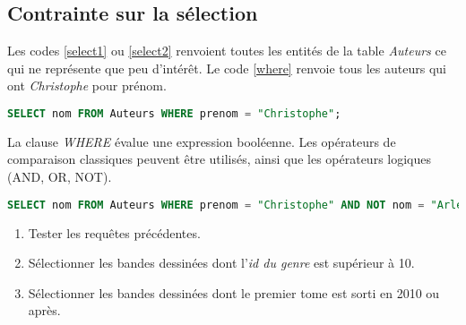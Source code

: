 \documentclass[a4paper,11pt]{article}
\begin{document}
\begin{Form}
\subsection{Contrainte sur la sélection}
Les codes \ref{select1} ou \ref{select2} renvoient toutes les entités de la table \emph{Auteurs} ce qui ne représente que peu d'intérêt. Le code \ref{where} renvoie tous les auteurs qui ont \emph{Christophe} pour prénom.
\begin{center}
\begin{lstlisting}[language=SQL]
SELECT nom FROM Auteurs WHERE prenom = "Christophe";
\end{lstlisting}
\label{where}
\end{center}
La clause \emph{WHERE} évalue une expression booléenne. Les opérateurs de comparaison classiques peuvent être utilisés, ainsi que les opérateurs logiques (AND, OR, NOT).
\begin{center}
\begin{lstlisting}[language=SQL]
SELECT nom FROM Auteurs WHERE prenom = "Christophe" AND NOT nom = "Arleston";
\end{lstlisting}
\label{where2}
\end{center}
\begin{activite}
\begin{enumerate}
\item Tester les requêtes précédentes.
\item Sélectionner les bandes dessinées dont l'\emph{id du genre} est supérieur à 10.
\item Sélectionner les bandes dessinées dont le premier tome est sorti en 2010 ou après.
\end{enumerate}
\end{activite}

\end{Form}
\end{document}

